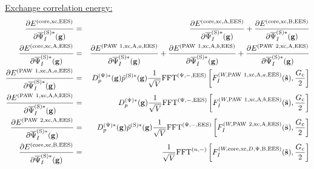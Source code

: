 \documentclass[paper=a4, fontsize=11pt]{article} %
\numberwithin{equation}{section} %
\numberwithin{figure}{section} %
\numberwithin{table}{section} %
\newcommand{\p}{\partial}
\newcommand{\bg}{{\bf{g}}}
\newcommand{\hs}{{\hat{\bf{s}}}}
\newcommand{\rS}{{\mathrm{S}}}
\newcommand{\rEES}{{\mathrm{EES}}}
\newcommand{\rxc}{{\mathrm{xc}}}
\newcommand{\rcore}{{\mathrm{core}}}
\newcommand{\rP}{{\mathrm{PAW}}}
\newcommand{\rA}{{\mathrm{A}}}
\newcommand{\rB}{{\mathrm{B}}}
\newcommand{\psigsc}{{\overline \Psi_I^{(\rS)*}(\bg)}}
\newcommand{\hGc}{{\frac{G_{\mathrm{c}}}{2}}}
\newcommand{\Dpgc}{{D^{(\Psi)*}_p(\bg)}}
\newcommand{\FFTni}{{\mathrm{FFT}^{(n,-)}}}
\newcommand{\FFTpiEES}{{\mathrm{FFT}^{(\Psi,-,\rEES)}}}
\begin{document}
\underline{Exchange correlation energy:}
\begin{eqnarray}
\frac{\p E^{(\rcore,\rxc,\rEES)}}{\p \psigsc}
&=& \frac{\p E^{(\rcore,\rxc,\rA,\rEES)}}{\p \psigsc} + \frac{\p E^{(\rcore,\rxc,\rB,\rEES)}}{\p \psigsc}\\
\frac{\p E^{(\rcore,\rxc,\rA,\rEES)}}{\p \psigsc}
&=& \frac{\p E^{(\rP\ 1,\rxc,\rA,a,\rEES)}}{\p \psigsc}+\frac{\p E^{(\rP\ 1,\rxc,\rA,b,\rEES)}}{\p \psigsc} + \frac{\p E^{(\rP\ 2,\rxc,\rA,\rEES)}}{\p \psigsc}\\
\label{cl:dExc1Aadp}
\frac{\p E^{(\rP\ 1,\rxc,\rA,a,\rEES)}}{\p \psigsc}
&=& \Dpgc \tilde p^{(\rS)*}(\bg)\frac{1}{\sqrt{V}} \FFTpiEES \left[F_I^{(W,\rP\ 1,\rxc,\rA,a,\rEES)}(\hs),\hGc \right] \\
\label{cl:dExc1Abdp}
\frac{\p E^{(\rP\ 1,\rxc,\rA,b,\rEES)}}{\p \psigsc}
&=& \Dpgc \frac{1}{\sqrt V}  \FFTpiEES \left[F_I^{(W,\rP\ 1,\rxc,\rA,b,\rEES)}(\hs),\hGc\right]\\
\label{cl:dExc2Adp}
\frac{\p E^{(\rP\ 2,\rxc,\rA,\rEES)}}{\p \psigsc}
&=& \Dpgc\tilde p^{(\rS)*}(\bg)\frac{1}{\sqrt{V}}\FFTpiEES \left[F_I^{(W,\rP\ 2,\rxc,\rA,\rEES)}(\hs),\hGc \right]\\
\label{cl:dExcBdp}
\frac{\p E^{(\rcore,\rxc,\rB,\rEES)}}{\p \psigsc}
&=& \frac{1}{\sqrt V} \FFTni \left[F_I^{(W,\rcore,\rxc,D,\Psi,\rB,\rEES)}(\hs),\hGc \right]
\end{eqnarray}
\end{document}
